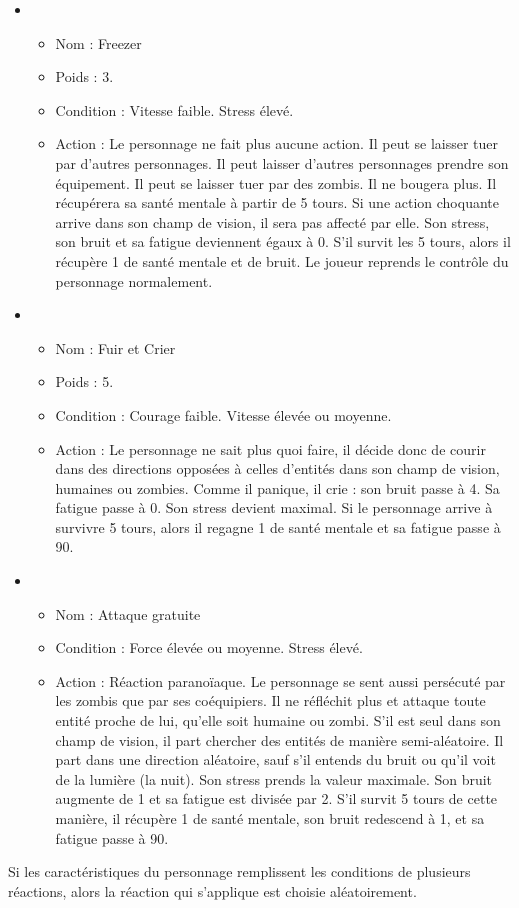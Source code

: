 \begin{itemize}
\begin{itemize}
   \end{itemize}
   \item \begin{itemize}
   		\item Nom : Freezer
   		\item Poids : 3.
   	 	\item Condition : Vitesse faible. Stress élevé.
   	 	\item Action : Le personnage ne fait plus aucune action. Il peut se laisser tuer par d'autres personnages. Il peut laisser d'autres personnages prendre son équipement. Il peut se laisser tuer par des zombis. Il ne bougera plus. Il récupérera sa santé mentale à partir de 5 tours. Si une action choquante arrive dans son champ de vision, il sera pas affecté par elle. Son stress, son bruit et sa fatigue deviennent égaux à 0. S'il survit les 5 tours, alors il récupère 1 de santé mentale et de bruit. Le joueur reprends le contrôle du personnage normalement.
   \end{itemize}
   \item \begin{itemize}
   		\item Nom : Fuir et Crier
   		\item Poids : 5.
   	 	\item Condition : Courage faible. Vitesse élevée ou moyenne.
   	 	\item Action : Le personnage ne sait plus quoi faire, il décide donc de courir dans des directions opposées à celles d'entités dans son champ de vision, humaines ou zombies. Comme il panique, il crie : son bruit passe à 4. Sa fatigue passe à 0. Son stress devient maximal. Si le personnage arrive à survivre 5 tours, alors il regagne 1 de santé mentale et sa fatigue passe à 90.
   \end{itemize}
   \item \begin{itemize}
   		\item Nom : Attaque gratuite
   	 	\item Condition : Force élevée ou moyenne. Stress élevé.
   	 	\item Action : Réaction paranoïaque. Le personnage se sent aussi persécuté par les zombis que par ses coéquipiers. Il ne réfléchit plus et attaque toute entité proche de lui, qu'elle soit humaine ou zombi. S'il est seul dans son champ de vision, il part chercher des entités de manière semi-aléatoire. Il part dans une direction aléatoire, sauf s'il entends du bruit ou qu'il voit de la lumière (la nuit). Son stress prends la valeur maximale. Son bruit augmente de 1 et sa fatigue est divisée par 2. S'il survit 5 tours de cette manière, il récupère 1 de santé mentale, son bruit redescend à 1, et sa fatigue passe à 90.
   \end{itemize}
\end{itemize}
Si les caractéristiques du personnage remplissent les conditions de plusieurs réactions, alors la réaction qui s'applique est choisie aléatoirement.
